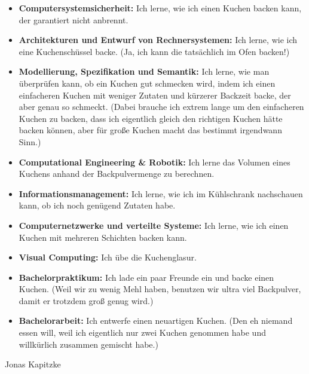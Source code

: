 {\begin{itemize}
        \item \textbf{Computersystemsicherheit:} Ich lerne, wie ich einen Kuchen
            backen kann, der garantiert nicht anbrennt.
        \item \textbf{Architekturen und Entwurf von Rechnersystemen:} Ich lerne,
            wie ich eine Kuchenschüssel backe. (Ja, ich kann die tatsächlich im Ofen
            backen!)
        \item \textbf{Modellierung, Spezifikation und Semantik:} Ich lerne, wie
            man überprüfen kann, ob ein Kuchen gut schmecken wird, indem ich einen
            einfacheren Kuchen mit weniger Zutaten und kürzerer Backzeit backe, der
            aber genau so schmeckt. (Dabei brauche ich extrem lange um den
            einfacheren Kuchen zu backen, dass ich eigentlich gleich den richtigen
            Kuchen hätte backen können, aber für große Kuchen macht das bestimmt
            irgendwann Sinn.)
        \item \textbf{Computational Engineering \& Robotik:} Ich lerne das
            Volumen eines Kuchens anhand der Backpulvermenge zu berechnen.
        \item \textbf{Informationsmanagement:} Ich lerne, wie ich im Kühlschrank
            nachschauen kann, ob ich noch genügend Zutaten habe.
        \item \textbf{Computernetzwerke und verteilte Systeme:}  Ich lerne, wie
            ich einen Kuchen mit mehreren Schichten backen kann.
        \item \textbf{Visual Computing:} Ich übe die Kuchenglasur.
        \item \textbf{Bachelorpraktikum:} Ich lade ein paar Freunde ein und
            backe einen Kuchen. (Weil wir zu wenig Mehl haben, benutzen wir ultra
            viel Backpulver, damit er trotzdem groß genug wird.)
        \item \textbf{Bachelorarbeit:} Ich entwerfe einen neuartigen Kuchen.
            (Den eh niemand essen will, weil ich eigentlich nur zwei Kuchen genommen
            habe und willkürlich zusammen gemischt habe.)
    \end{itemize}
}
{Jonas Kapitzke}
